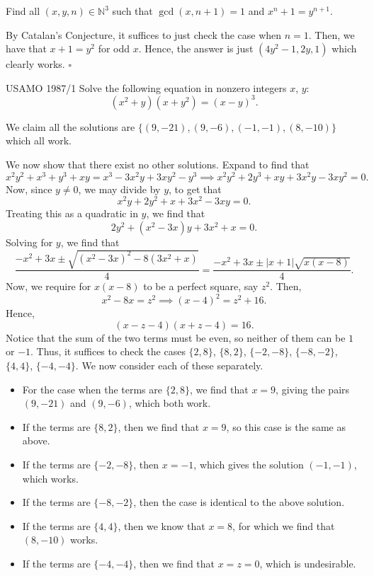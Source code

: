 \documentclass{article}
\begin{document}
\begin{problem}[4.9.6]{}
Find all $(x, y, n) \in \mathbb{N}^3$ such that $\gcd(x, n + 1) = 1$ and $x^n + 1 = y^{n+1}$.
\end{problem}

By Catalan's Conjecture, it suffices to just check the case when $n = 1$. Then, we have that $x+1 = y^2$ for odd $x$. Hence, the answer is just $(4y^2-1, 2y, 1)$ which clearly works. $\square$

\begin{problem}[4.9.7]{USAMO 1987/1}
Solve the following equation in nonzero integers $x$, $y$: \[(x^2+y)(x+y^2)= (x - y)^3.\]
\end{problem}

We claim all the solutions are $\{(9, -21), (9, -6), (-1, -1), (8, -10)\}$ which all work.

We now show that there exist no other solutions. Expand to find that \[x^2y^2+x^3+y^3+xy = x^3-3x^2y+3xy^2-y^3 \implies x^2y^2+2y^3+xy+3x^2y-3xy^2 = 0.\] Now, since $y \neq 0$, we may divide by $y$, to get that \[x^2y+2y^2+x+3x^2-3xy = 0.\] Treating this as a quadratic in $y$, we find that \[2y^2+(x^2-3x)y+3x^2+x = 0.\] Solving for $y$, we find that \[\dfrac{-x^2+3x\pm\sqrt{(x^2-3x)^2-8(3x^2+x)}}{4} = \dfrac{-x^2+3x\pm|x+1|\sqrt{x(x-8)}}{4}.\] Now, we require for $x(x-8)$ to be a perfect square, say $z^2$. Then, \[x^2-8x = z^2 \implies (x-4)^2 = z^2+16.\] Hence, \[(x-z-4)(x+z-4) = 16.\] Notice that the sum of the two terms must be even, so neither of them can be $1$ or $-1$. Thus, it suffices to check the cases $\{2, 8\}$, $\{8, 2\}$, $\{-2, -8\}$, $\{-8, -2\}$, $\{4, 4\}$, $\{-4, -4\}$. We now consider each of these separately.
\begin{itemize}
\item For the case when the terms are $\{2, 8\}$, we find that $x = 9$, giving the pairs $(9, -21)$ and $(9, -6)$, which both work.
\item If the terms are $\{8, 2\}$, then we find that $x = 9$, so this case is the same as above.
\item If the terms are $\{-2, -8\}$, then $x = -1$, which gives the solution $(-1, -1)$, which works.
\item If the terms are $\{-8, -2\}$, then the case is identical to the above solution.
\item If the terms are $\{4, 4\}$, then we know that $x = 8$, for which we find that $(8, -10)$ works.
\item If the terms are $\{-4, -4\}$, then we find that $x = z = 0$, which is undesirable.
\end{itemize}
\end{document}
